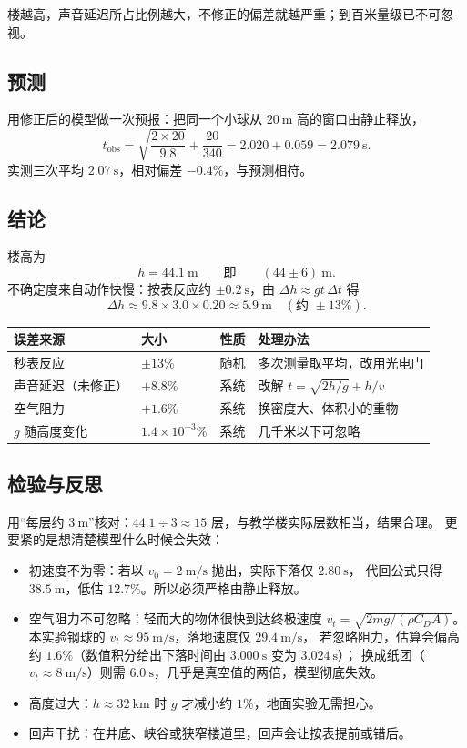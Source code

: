 楼越高，声音延迟所占比例越大，不修正的偏差就越严重；到百米量级已不可忽视。

\subsection{预测}
用修正后的模型做一次预报：把同一个小球从 $20\ \mathrm{m}$ 高的窗口由静止释放，
\[
  t_{\text{obs}}=\sqrt{\frac{2\times20}{9.8}}+\frac{20}{340}
  =2.020+0.059=2.079\ \mathrm{s}.
\]
实测三次平均 $2.07\ \mathrm{s}$，相对偏差 $-0.4\%$，与预测相符。

\subsection{结论}
楼高为
\[
  h=44.1\ \mathrm{m}\qquad\text{即}\qquad(44\pm6)\ \mathrm{m}.
\]
不确定度来自动作快慢：按表反应约 $\pm0.2\ \mathrm{s}$，由 $\Delta h\approx gt\,\Delta t$ 得
\[
  \Delta h\approx9.8\times3.0\times0.20\approx5.9\ \mathrm{m}\quad(\text{约 }\pm13\%).
\]

\begin{center}
\footnotesize
\setlength{\tabcolsep}{4pt}
\renewcommand{\arraystretch}{1.4}
\begin{tabular}{p{3.0cm}p{2.2cm}p{1.8cm}p{4.4cm}}
\toprule
误差来源 & 大小 & 性质 & 处理办法 \\
\midrule
秒表反应        & $\pm13\%$            & 随机 & 多次测量取平均，改用光电门 \\
声音延迟（未修正） & $+8.8\%$          & 系统 & 改解 $t=\sqrt{2h/g}+h/v$ \\
空气阻力        & $+1.6\%$              & 系统 & 换密度大、体积小的重物 \\
$g$ 随高度变化  & $1.4\times10^{-3}\%$  & 系统 & 几千米以下可忽略 \\
\bottomrule
\end{tabular}
\end{center}

\subsection{检验与反思}
用“每层约 $3\ \mathrm{m}$”核对：$44.1\div3\approx15$ 层，与教学楼实际层数相当，结果合理。
更要紧的是想清楚模型什么时候会失效：
\begin{itemize}
  \item 初速度不为零：若以 $v_0=2\ \mathrm{m/s}$ 抛出，实际下落仅 $2.80\ \mathrm{s}$，
        代回公式只得 $38.5\ \mathrm{m}$，低估 $12.7\%$。所以必须严格由静止释放。
  \item 空气阻力不可忽略：轻而大的物体很快到达终极速度 $v_t=\sqrt{2mg/(\rho C_DA)}$。
        本实验钢球的 $v_t\approx95\ \mathrm{m/s}$，落地速度仅 $29.4\ \mathrm{m/s}$，
        若忽略阻力，估算会偏高约 $1.6\%$（数值积分给出下落时间由 $3.000\ \mathrm{s}$ 变为 $3.024\ \mathrm{s}$）；
        换成纸团（$v_t\approx8\ \mathrm{m/s}$）则需 $6.0\ \mathrm{s}$，几乎是真空值的两倍，模型彻底失效。
  \item 高度过大：$h\approx32\ \mathrm{km}$ 时 $g$ 才减小约 $1\%$，地面实验无需担心。
  \item 回声干扰：在井底、峡谷或狭窄楼道里，回声会让按表提前或错后。
\end{itemize}
